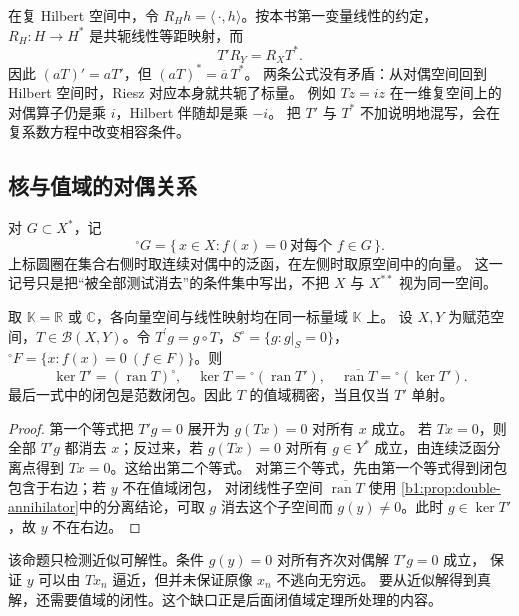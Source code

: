 在复 Hilbert 空间中，令 \(R_Hh=\langle\,\cdot,h\rangle\)。按本书第一变量线性的约定，
\(R_H:H\rightarrow H^*\) 是共轭线性等距映射，而
\[
 T'R_Y=R_XT^*.
\]
因此 \((aT)'=aT'\)，但 \((aT)^*=\overline a\,T^*\)。
两条公式没有矛盾：从对偶空间回到 Hilbert 空间时，Riesz 对应本身就共轭了标量。
例如 \(Tz=iz\) 在一维复空间上的对偶算子仍是乘 \(i\)，Hilbert 伴随却是乘 \(-i\)。
把 \(T'\) 与 \(T^*\) 不加说明地混写，会在复系数方程中改变相容条件。

\subsection{核与值域的对偶关系}
\label{b1:subsec:C10103}

对 \(G\subset X^*\)，记
\[
 {}^\circ G=\{\,x\in X:f(x)=0\ \text{对每个 }f\in G\,\}.
\]
上标圆圈在集合右侧时取连续对偶中的泛函，在左侧时取原空间中的向量。
这一记号只是把“被全部测试消去”的条件集中写出，不把 \(X\) 与 \(X^{**}\) 视为同一空间。

\begin{proposition}\label{b1:prop:C1-range-annihilator}
取 \(\mathbb K=\mathbb R\) 或 \(\mathbb C\)，各向量空间与线性映射均在同一标量域 \(\mathbb K\) 上。
设 \(X,Y\) 为赋范空间，\(T\in\mathcal B(X,Y)\)。令 \(T^{\prime}g=g\circ T\)，\(S^\circ=\{g:g|_S=0\}\)，\({}^\circ F=\{x:f(x)=0\ (f\in F)\}\)。则
\[
 \ker T'=(\operatorname{ran}T)^\circ,\quad
 \ker T={}^{\circ}(\operatorname{ran}T'),\quad
 \overline{\operatorname{ran}T}={}^{\circ}(\ker T').
\]
最后一式中的闭包是范数闭包。因此 \(T\) 的值域稠密，当且仅当 \(T'\) 单射。
\end{proposition}
\begin{proof}
第一个等式把 \(T'g=0\) 展开为 \(g(Tx)=0\) 对所有 \(x\) 成立。
若 \(Tx=0\)，则全部 \(T'g\) 都消去 \(x\)；反过来，若 \(g(Tx)=0\) 对所有
\(g\in Y^*\) 成立，由连续泛函分离点得到 \(Tx=0\)。这给出第二个等式。
对第三个等式，先由第一个等式得到闭包包含于右边；若 \(y\) 不在值域闭包，
对闭线性子空间 \(\overline{\operatorname{ran}T}\) 使用%
\cref{b1:prop:double-annihilator}中的分离结论，可取 \(g\) 消去这个子空间而
\(g(y)\ne0\)。此时 \(g\in\ker T'\)，故 \(y\) 不在右边。
\end{proof}

该命题只检测近似可解性。条件 \(g(y)=0\) 对所有齐次对偶解 \(T'g=0\) 成立，
保证 \(y\) 可以由 \(Tx_n\) 逼近，但并未保证原像 \(x_n\) 不逃向无穷远。
要从近似解得到真解，还需要值域的闭性。这个缺口正是后面闭值域定理所处理的内容。
